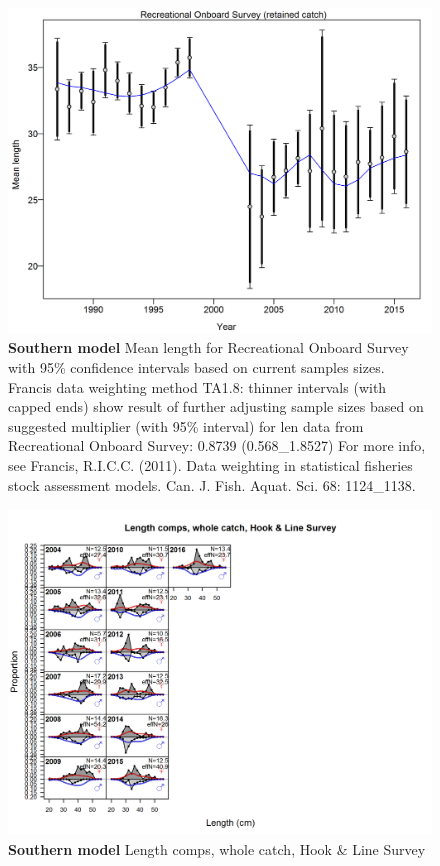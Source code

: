 \documentclass[12pt,]{article}
\begin{document}
\begin{figure}[htbp]
\centering
\includegraphics{./tex2pdf.8516/155bdf0dcf48ae8de48f34a902b01aa8dbdff836.png}
\caption{\textbf{Southern model} Mean length for Recreational Onboard
Survey with 95\% confidence intervals based on current samples sizes.
Francis data weighting method TA1.8: thinner intervals (with capped
ends) show result of further adjusting sample sizes based on suggested
multiplier (with 95\% interval) for len data from Recreational Onboard
Survey: 0.8739 (0.568\_1.8527) For more info, see Francis, R.I.C.C.
(2011). Data weighting in statistical fisheries stock assessment models.
Can. J. Fish. Aquat. Sci. 68: 1124\_1138.
\label{fig:mod2_12_comp_lenfit_data_weighting_TA1.8_Recreational Onboard Survey}}
\end{figure}

\begin{figure}[htbp]
\centering
\includegraphics{./r4ss/plots_mod2/comp_lenfit_flt4mkt0.png}
\caption{\textbf{Southern model} Length comps, whole catch, Hook \& Line
Survey \label{fig:mod2_13_comp_lenfit_flt4mkt0}}
\end{figure}
\end{document}
